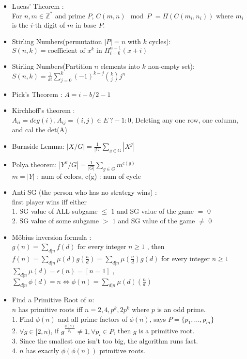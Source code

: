 \begin{itemize}
\item Lucas’ Theorem :\\
  For $n, m \in \mathbb{Z}^{*}$ and prime $P$,
  $C(m,n) \mod P$
	$= \Pi ( C(m_i,n_i) )$
	where $m_i$ is the $i$-th digit of $m$ in base $P$.
\item Stirling Numbers(permutation $|P|=n$ with $k$ cycles): \\
  $S(n,k) = \text{coefficient of }x^k \text{ in } \Pi_{i=0}^{n-1} (x+i)$
\item Stirling Numbers(Partition $n$ elements into $k$ non-empty set): \\
  $S(n,k) = \frac{1}{k!} \sum\limits_{j=0}^k (-1)^{k-j} {k \choose j} j^n$
\item Pick’s Theorem : $A = i + b/2 - 1$
\item Kirchhoff's theorem :\\
  $A_{ii} = deg(i), A_{ij} = (i,j) \in E\ ? -1 : 0$,
  Deleting any one row, one column, and cal the det(A)
\item Burnside Lemma:
  $|X/G|=\frac{1}{|G|}\sum\limits_{g \in G} {|X^g|}$
\item Polya theorem:
  $|Y^x/G|=\frac{1}{|G|}\sum\limits_{g \in G} {m^{c(g)}}$\\
  $m = |Y|$ : num of colors, c(g) : num of cycle
\item Anti SG (the person who has no strategy wins) :\\
  first player wins iff either\\
  1. SG value of ALL subgame $\le$ $1$ and SG value of the game $=$ $0$\\
  2. SG value of some subgame $>$ $1$ and SG value of the game $\neq$ $0$
\item Möbius inversion formula :\\
  $g(n) = \sum\limits_{d|n}f(d)$ for every integer $n\ge 1$ , then\\
  $f(n) = \sum\limits_{d|n}\mu(d)g(\frac{n}{d}) = \sum\limits_{d|n}\mu(\frac{n}{d})g(d)$ for every integer $n\ge 1$\\
  $\sum\limits_{d|n}\mu(d)=\epsilon(n)=[n=1]$ , 
  $\sum\limits_{d|n}\phi(d)=n\Leftrightarrow \phi(n)=\sum\limits_{d|n}\mu(d)(\frac{n}{d})$
\item Find a Primitive Root of $n$:\\
  $n$ has primitive roots iff $n=2,4,p^k,2p^k$ where $p$ is an odd prime.\\
  1. Find $\phi(n)$ and all prime factors of $\phi(n)$, says $P=\{p_1,...,p_m\}$\\
  2. $\forall g\in[2,n)$, if $g^{\frac{\phi(n)}{p_i}}\ne 1,\forall p_i\in P$, then $g$ is a primitive root.\\
  3. Since the smallest one isn't too big, the algorithm runs fast.\\
  4. $n$ has exactly $\phi(\phi(n))$ primitive roots.
\end{itemize}
